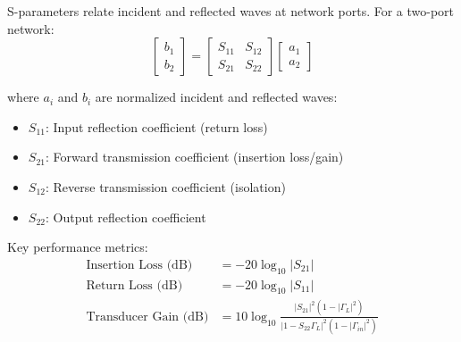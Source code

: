 \documentclass[11pt,a4paper]{article}
\begin{document}
S-parameters relate incident and reflected waves at network ports. For a two-port network:
\begin{equation}
\begin{bmatrix} b_1 \\ b_2 \end{bmatrix} = \begin{bmatrix} S_{11} & S_{12} \\ S_{21} & S_{22} \end{bmatrix} \begin{bmatrix} a_1 \\ a_2 \end{bmatrix}
\end{equation}

where $a_i$ and $b_i$ are normalized incident and reflected waves:
\begin{itemize}
\item $S_{11}$: Input reflection coefficient (return loss)
\item $S_{21}$: Forward transmission coefficient (insertion loss/gain)
\item $S_{12}$: Reverse transmission coefficient (isolation)
\item $S_{22}$: Output reflection coefficient
\end{itemize}

Key performance metrics:
\begin{align}
\text{Insertion Loss (dB)} &= -20\log_{10}|S_{21}| \\
\text{Return Loss (dB)} &= -20\log_{10}|S_{11}| \\
\text{Transducer Gain (dB)} &= 10\log_{10}\frac{|S_{21}|^2(1-|\Gamma_L|^2)}{|1-S_{22}\Gamma_L|^2(1-|\Gamma_{in}|^2)}
\end{align}
\end{document}

